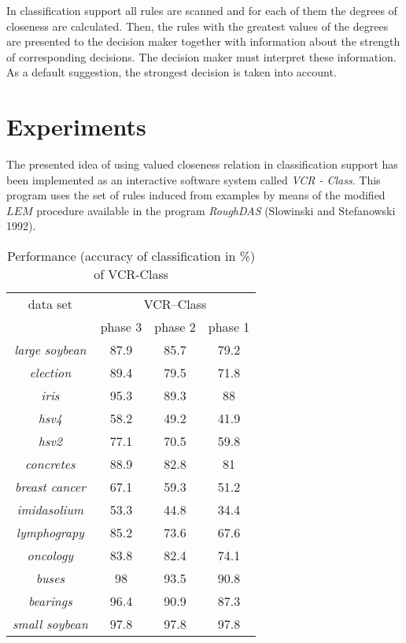 In classification support all rules are scanned and for each of  them
the degrees of closeness are calculated. Then, the  rules  with  the
greatest values of the degrees are presented to  the  decision  maker
together  with  information  about  the  strength  of   corresponding
decisions. The decision maker must interpret these information. As  a
default suggestion, the strongest decision is taken into account.

\section{Experiments}

The presented idea of using valued closeness  relation in classification
support  has been implemented as an  interactive  software  system
called {\it VCR - Class}. This program  uses   the   set   of   rules
induced from examples by means of the  modified $LEM$ procedure available
in the program {\it RoughDAS} (Slowinski and Stefanowski 1992).

{\footnotesize
\begin{table}
\begin{center}
\caption{Performance (accuracy of classification in \%) of
VCR-Class}
\vspace{5pt}
\begin{tabular}{|c|c|c|c|} \hline
data set & \multicolumn{3}{|c|}{VCR--Class} \\ \cline{2-4}
         & phase 3 & phase 2 & phase 1 \\ \hline
{\it large soybean} & 87.9 & 85.7 & 79.2\\ \hline
{\it election} & 89.4 & 79.5 & 71.8\\ \hline
{\it iris} & 95.3  & 89.3 & 88 \\ \hline
{\it hsv4} & 58.2 & 49.2 & 41.9 \\ \hline
{\it hsv2} & 77.1 & 70.5 & 59.8\\ \hline
{\it concretes} & 88.9 & 82.8 & 81\\ \hline
{\it breast cancer} & 67.1 & 59.3 & 51.2 \\ \hline
{\it imidasolium} & 53.3 & 44.8 & 34.4 \\ \hline
{\it lymphograpy} & 85.2 & 73.6 & 67.6 \\ \hline
{\it oncology} & 83.8 & 82.4 & 74.1\\ \hline
{\it buses} & 98 & 93.5 & 90.8\\ \hline
{\it bearings} & 96.4 & 90.9 & 87.3 \\ \hline
{\it small soybean} & 97.8 & 97.8 & 97.8 \\ \hline
\end{tabular}
\end{center}
\end{table}
}

